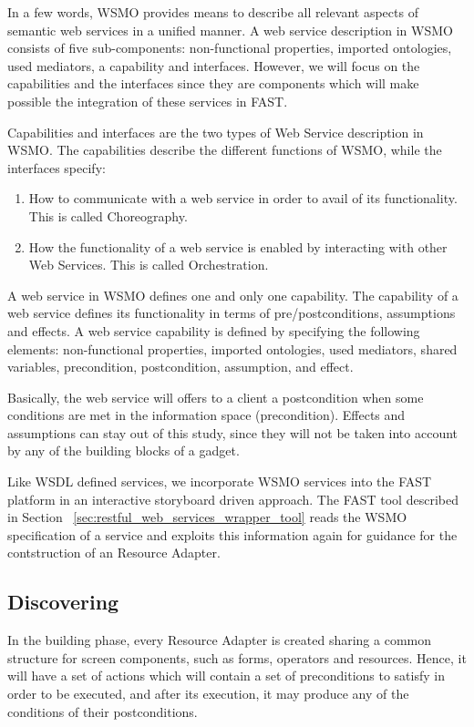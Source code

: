 \documentclass{article}
\begin{document}
In a few words, WSMO provides means to describe all relevant aspects of semantic web services in a unified manner. A web service description in WSMO consists of five sub-components: non-functional properties, imported ontologies, used mediators, a capability and interfaces. However, we will focus on the capabilities and the interfaces since they are components which will make possible the integration of these services in FAST.

Capabilities and interfaces are the two types of Web Service description in WSMO. The capabilities describe the different functions of WSMO, while the interfaces specify:
\begin{enumerate}
	\item How to communicate with a web service in order to avail of its functionality. This is called Choreography.
	\item How the functionality of a web service is enabled by interacting with other Web Services. This is called Orchestration.
\end{enumerate}

A web service in WSMO defines one and only one capability. The capability of a web service defines its functionality in terms of pre/postconditions, assumptions and effects. A web service capability is defined by specifying the following elements: non-functional properties, imported ontologies, used mediators, shared variables, precondition, postcondition, assumption, and effect.

Basically, the web service will offers to a client a postcondition when some conditions are met in the information space (precondition). Effects and assumptions can stay out of this study, since they will not be taken into account by any of the building blocks of a gadget.

Like WSDL defined services, we incorporate WSMO services into the FAST platform in an interactive storyboard driven approach. The FAST tool described in Section ~\ref{sec:restful_web_services_wrapper_tool} reads the WSMO specification of a service and exploits this information again for guidance for the contstruction of an Resource Adapter. 


\subsection{Discovering} %
\label{sub:discovering}

In the building phase, every Resource Adapter is created sharing a common structure for screen components, such as forms, operators and resources. Hence, it will have a set of actions which will contain a set of preconditions to satisfy in order to be executed, and after its execution, it may produce any of the conditions of their postconditions.
\end{document}
